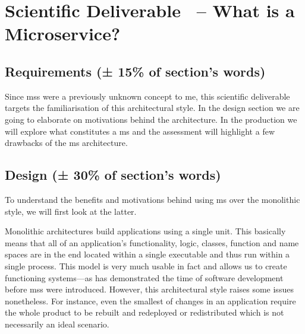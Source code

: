 \section{Scientific Deliverable \thesdel\ -- What is a Microservice?}
\label{sd:ms}


\subsection{Requirements (± 15\% of section's words)}

Since \glspl{ms} were a previously unknown concept to me, this
scientific deliverable targets the familiarisation of this
architectural style. In the design section we are going to elaborate
on motivations behind the architecture.  In the production we will
explore what constitutes a \gls{ms} and the assessment will highlight
a few drawbacks of the \gls{ms} architecture.

\subsection{Design (± 30\% of section's words)}

To understand the benefits and motivations behind using \gls{ms} over
the monolithic style, we will first look at the latter.
\cite{ms-definition}

Monolithic architectures build applications using a single unit. This
basically means that all of an application's functionality, logic,
classes, function and name spaces are in the end located within a
single executable and thus run within a single process. This model is
very much usable in fact and allows us to create functioning
systems---as has demonstrated the time of software development before
\glspl{ms} were introduced. However, this architectural style raises
some issues nonetheless. For instance, even the smallest of changes in
an application require the whole product to be rebuilt and redeployed
or redistributed which is not necessarily an ideal scenario.

